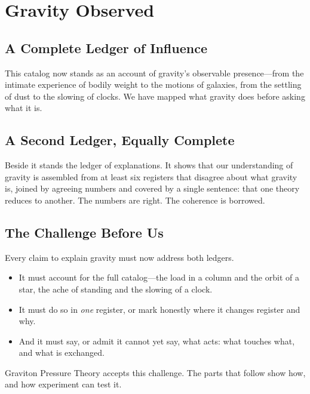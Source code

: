 \documentclass[11pt,a4paper]{article}
\begin{document}
\section{Gravity Observed}

\subsection{A Complete Ledger of Influence}

This catalog now stands as an account of gravity's observable presence---from the intimate experience of bodily weight to the motions of galaxies, from the settling of dust to the slowing of clocks. We have mapped what gravity does before asking what it is.

\subsection{A Second Ledger, Equally Complete}

Beside it stands the ledger of explanations. It shows that our understanding of gravity is assembled from at least six registers that disagree about what gravity is, joined by agreeing numbers and covered by a single sentence: that one theory reduces to another. The numbers are right. The coherence is borrowed.

\subsection{The Challenge Before Us}

Every claim to explain gravity must now address both ledgers.

\begin{itemize}
  \item It must account for the full catalog---the load in a column and the orbit of a star, the ache of standing and the slowing of a clock.
  \item It must do so in \emph{one} register, or mark honestly where it changes register and why.
  \item And it must say, or admit it cannot yet say, what acts: what touches what, and what is exchanged.
\end{itemize}

Graviton Pressure Theory accepts this challenge.  The parts that follow show how, and how experiment can test it.
\end{document}
